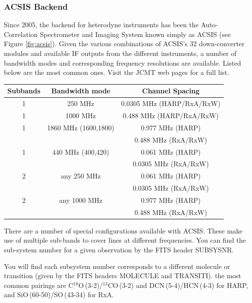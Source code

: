 \documentclass[twoside,11pt]{article}
\renewcommand{\_}{\texttt{\symbol{95}}}
\begin{document}
\subsubsection{ACSIS Backend}
Since 2005, the backend for heterodyne instruments has been the Auto-Correlation Spectrometer and Imaging System known simply as ACSIS (see Figure \ref{fig:acsis}). Given the various combinations of ACSIS's 32 down-converter modules and available IF outputs from the different instruments, a number of bandwidth modes and corresponding frequency resolutions are available. Listed below are the most common ones. Visit the JCMT web pages for a full list.
\newpage
\begin{table}[h!]
\begin{center}
\begin{tabular}{c|c|c}
\hline
\textbf{Subbands} & \textbf{Bandwidth mode}&	\textbf{Channel Spacing}\\
\hline
1 & 250 MHz &	0.0305 MHz (HARP/RxA/RxW)\\
1 &1000 MHz&	0.488 MHz (HARP/RxA/RxW)\\
1 &1860 MHz (1600,1800) &	0.977 MHz (HARP) \\
 & & 0.488 MHz (RxA/RxW)\\
1 &440  MHz (400,420) &	0.061 MHz (HARP) \\
 & &	 0.0305 MHz (RxA/RxW)\\
\hline
2  & any 250 MHz&	0.061 MHz (HARP)\\
  &&	 0.0305 MHz (RxA/RxW)\\
2 &any 1000 MHz&	0.977 MHz (HARP) \\
 && 0.488 MHz (RxA/RxW)\\
\hline
\end{tabular}
\end{center}
\end{table}
There are a number of special configurations available with ACSIS. These make use of multiple sub-bands to cover lines at different frequencies.  You can find the sub-system number for a given observation by the FITS header SUBSYSNR.

You will find each subsystem number corresponds to a different molecule or transition (given by the FITS headers MOLECULE and TRANSITI). the most common pairings are C$^{18}$O\,(3-2)/$^{13}$CO\,(3-2) and DCN\,(5-4)/HCN\,(4-3)  for HARP, and SiO\,(60-50)/SO\,(43-34) for RxA.
\end{document}
